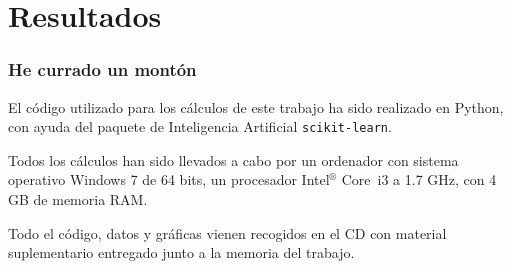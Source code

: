 \documentclass[10pt]{beamer}
\begin{document}
\section{Resultados}

\begin{frame}
	\frametitle{He currado un mont\'on}
	El c\'odigo utilizado para los c\'alculos de este trabajo ha sido realizado en Python, con ayuda del paquete de Inteligencia Artificial \texttt{scikit-learn}. 

	Todos los c\'alculos han sido llevados a cabo por un ordenador con sistema operativo Windows 7 de 64 bits, un procesador Intel$^\circledR$ Core\texttrademark \ i3 a 1.7 GHz, con 4 GB de memoria RAM.

Todo el c\'odigo, datos y gr\'aficas vienen recogidos en el CD con material suplementario entregado junto a la memoria del trabajo.
\end{frame}
\end{document}
